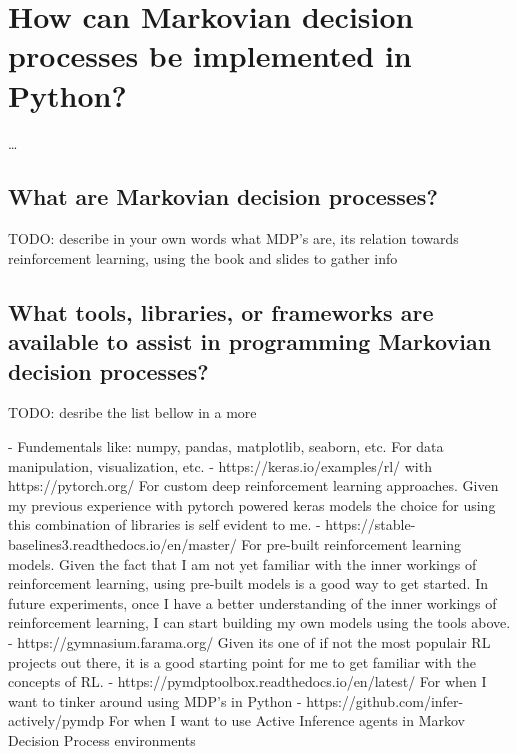 \section{How can Markovian decision processes be implemented in Python?}

\dots

\subsection{What are Markovian decision processes?}

TODO: describe in your own words what MDP's are, its relation towards reinforcement learning, using the book and slides to gather info

\subsection{What tools, libraries, or frameworks are available to assist in programming Markovian decision processes?}

TODO: desribe the list bellow in a more 

- Fundementals like: numpy, pandas, matplotlib, seaborn, etc.
    For data manipulation, visualization, etc.
- https://keras.io/examples/rl/ with https://pytorch.org/
    For custom deep reinforcement learning approaches. 
    Given my previous experience with pytorch powered keras models the choice for using this combination of libraries is self evident to me.
- https://stable-baselines3.readthedocs.io/en/master/
    For pre-built reinforcement learning models. 
    Given the fact that I am not yet familiar with the inner workings of reinforcement learning, using pre-built models is a good way to get started.
    In future experiments, once I have a better understanding of the inner workings of reinforcement learning, I can start building my own models using the tools above.
- https://gymnasium.farama.org/
    Given its one of if not the most populair RL projects out there, it is a good starting point for me to get familiar with the concepts of RL.
- https://pymdptoolbox.readthedocs.io/en/latest/
    For when I want to tinker around using MDP's in Python
- https://github.com/infer-actively/pymdp
    For when I want to use Active Inference agents in Markov Decision Process environments